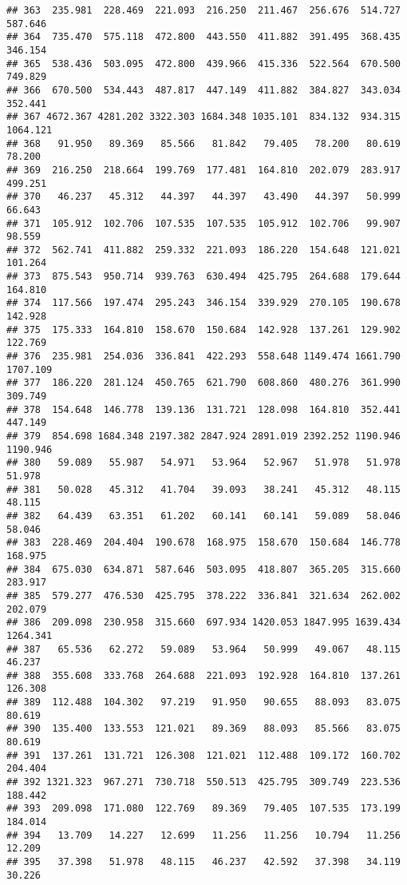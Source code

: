 \documentclass[
]{article}
\begin{document}
\begin{verbatim}
## 363  235.981  228.469  221.093  216.250  211.467  256.676  514.727  587.646
## 364  735.470  575.118  472.800  443.550  411.882  391.495  368.435  346.154
## 365  538.436  503.095  472.800  439.966  415.336  522.564  670.500  749.829
## 366  670.500  534.443  487.817  447.149  411.882  384.827  343.034  352.441
## 367 4672.367 4281.202 3322.303 1684.348 1035.101  834.132  934.315 1064.121
## 368   91.950   89.369   85.566   81.842   79.405   78.200   80.619   78.200
## 369  216.250  218.664  199.769  177.481  164.810  202.079  283.917  499.251
## 370   46.237   45.312   44.397   44.397   43.490   44.397   50.999   66.643
## 371  105.912  102.706  107.535  107.535  105.912  102.706   99.907   98.559
## 372  562.741  411.882  259.332  221.093  186.220  154.648  121.021  101.264
## 373  875.543  950.714  939.763  630.494  425.795  264.688  179.644  164.810
## 374  117.566  197.474  295.243  346.154  339.929  270.105  190.678  142.928
## 375  175.333  164.810  158.670  150.684  142.928  137.261  129.902  122.769
## 376  235.981  254.036  336.841  422.293  558.648 1149.474 1661.790 1707.109
## 377  186.220  281.124  450.765  621.790  608.860  480.276  361.990  309.749
## 378  154.648  146.778  139.136  131.721  128.098  164.810  352.441  447.149
## 379  854.698 1684.348 2197.382 2847.924 2891.019 2392.252 1190.946 1190.946
## 380   59.089   55.987   54.971   53.964   52.967   51.978   51.978   51.978
## 381   50.028   45.312   41.704   39.093   38.241   45.312   48.115   48.115
## 382   64.439   63.351   61.202   60.141   60.141   59.089   58.046   58.046
## 383  228.469  204.404  190.678  168.975  158.670  150.684  146.778  168.975
## 384  675.030  634.871  587.646  503.095  418.807  365.205  315.660  283.917
## 385  579.277  476.530  425.795  378.222  336.841  321.634  262.002  202.079
## 386  209.098  230.958  315.660  697.934 1420.053 1847.995 1639.434 1264.341
## 387   65.536   62.272   59.089   53.964   50.999   49.067   48.115   46.237
## 388  355.608  333.768  264.688  221.093  192.928  164.810  137.261  126.308
## 389  112.488  104.302   97.219   91.950   90.655   88.093   83.075   80.619
## 390  135.400  133.553  121.021   89.369   88.093   85.566   83.075   80.619
## 391  137.261  131.721  126.308  121.021  112.488  109.172  160.702  204.404
## 392 1321.323  967.271  730.718  550.513  425.795  309.749  223.536  188.442
## 393  209.098  171.080  122.769   89.369   79.405  107.535  173.199  184.014
## 394   13.709   14.227   12.699   11.256   11.256   10.794   11.256   12.209
## 395   37.398   51.978   48.115   46.237   42.592   37.398   34.119   30.226

\end{verbatim}
\end{document}
